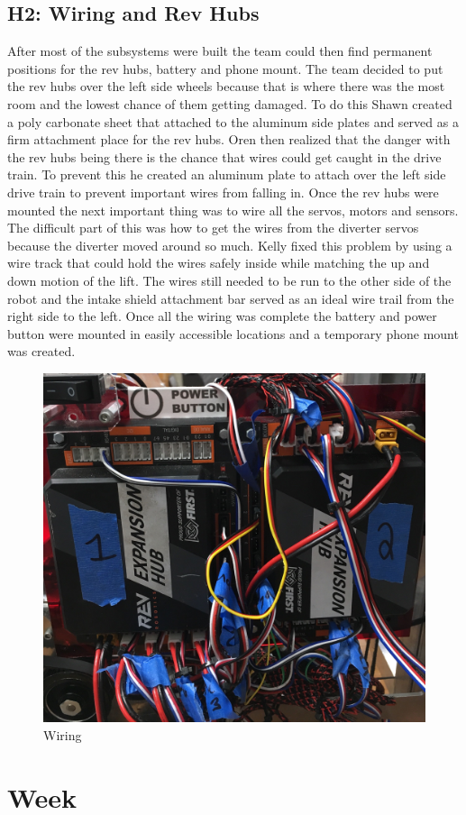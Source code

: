\documentclass{article}
\begin{document}
\subsection{H2: Wiring and Rev Hubs}

After most of the subsystems were built the team could then find permanent positions for the rev hubs, battery and phone mount. The team decided to put the rev hubs over the left side wheels because that is where there was the most room and the lowest chance of them getting damaged. To do this Shawn created a poly carbonate sheet that attached to the aluminum side plates and served as a firm attachment place for the rev hubs. Oren then realized that the danger with the rev hubs being there is the chance that wires could get caught in the drive train. To prevent this he created an aluminum plate to attach over the left side drive train to prevent important wires from falling in. Once the rev hubs were mounted the next important thing was to wire all the servos, motors and sensors. The difficult part of this was how to get the wires from the diverter servos because the diverter moved around so much. Kelly fixed this problem by using a wire track that could hold the wires safely inside while matching the up and down motion of the lift. The wires still needed to be run to the other side of the robot and the intake shield attachment bar served as an ideal wire trail from the right side to the left. Once all the wiring was complete the battery and power button were mounted in easily accessible locations and a temporary phone mount was created.

\begin{figure}
    \centering
    \includegraphics[width=.6 \textwidth]{20_01-14/images/wiring.jpg}
    \caption{Wiring}
    \label{fig:wiring}
\end{figure}
\clearpage \newpage \section{Week \thesection} 
\end{document}
